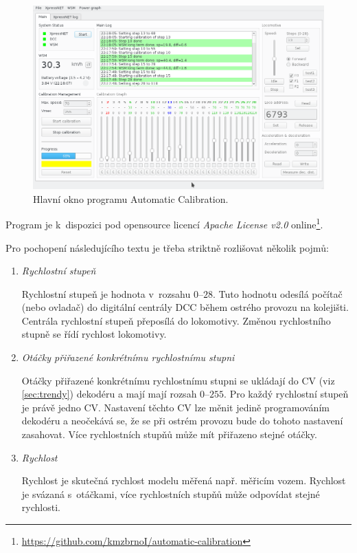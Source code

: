 \begin{figure}[h]
\includegraphics[width=\textwidth]{data/ac_progress.png}
\caption{Hlavní okno programu Automatic Calibration.}
\label{fig:ac-gui}
\end{figure}

Program je k~dispozici pod opensource licencí \textit{Apache License v2.0}
online\footnote{\url{https://github.com/kmzbrnoI/automatic-calibration}}.

Pro pochopení následujícího textu je třeba striktně rozlišovat několik pojmů:

\begin{enumerate}
\item \textit{Rychlostní stupeň}

Rychlostní stupeň je hodnota v~rozsahu $0$--$28$. Tuto hodnotu odesílá počítač
(nebo ovladač) do digitální centrály DCC během ostrého provozu na kolejišti.
Centrála rychlostní stupeň přeposílá do lokomotivy. Změnou rychlostního stupně
se řídí rychlost lokomotivy.

\item \textit{Otáčky přiřazené konkrétnímu rychlostnímu stupni}

Otáčky přiřazené konkrétnímu rychlostnímu stupni se ukládají do CV (viz
\ref{sec:trendy}) dekodéru a mají mají rozsah $0$--$255$. Pro každý rychlostní
stupeň je právě jedno CV. Nastavení těchto CV lze měnit jedině programováním
dekodéru a neočekává se, že se při ostrém provozu bude do tohoto nastavení
zasahovat. Více rychlostních stupňů může mít přiřazeno stejné otáčky.

\item \textit{Rychlost}

Rychlost je skutečná rychlost modelu měřená např. měřicím vozem. Rychlost
je svázaná s~otáčkami, více rychlostních stupňů může odpovídat stejné rychlosti.

\end{enumerate}

